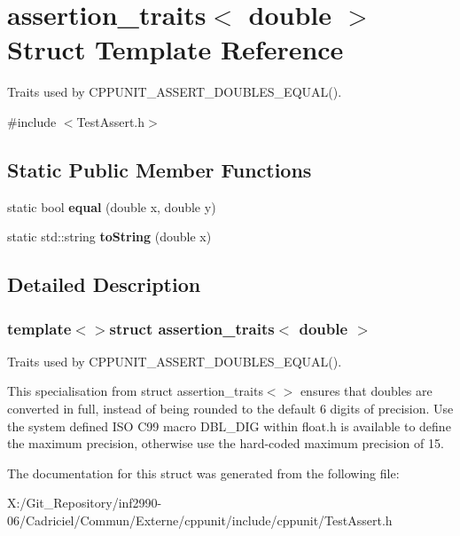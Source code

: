 \hypertarget{structassertion__traits_3_01double_01_4}{\section{assertion\-\_\-traits$<$ double $>$ Struct Template Reference}
\label{structassertion__traits_3_01double_01_4}
}


Traits used by C\-P\-P\-U\-N\-I\-T\-\_\-\-A\-S\-S\-E\-R\-T\-\_\-\-D\-O\-U\-B\-L\-E\-S\-\_\-\-E\-Q\-U\-A\-L().  




{\ttfamily \#include $<$Test\-Assert.\-h$>$}

\subsection*{Static Public Member Functions}
\begin{DoxyCompactItemize}
\item 
\hypertarget{structassertion__traits_3_01double_01_4_ac0d9d71ec0f239664b88188e481c0598}{static bool {\bfseries equal} (double x, double y)}\label{structassertion__traits_3_01double_01_4_ac0d9d71ec0f239664b88188e481c0598}

\item 
\hypertarget{structassertion__traits_3_01double_01_4_a6bc37874eb60d30e0b50d4c127ab34df}{static std\-::string {\bfseries to\-String} (double x)}\label{structassertion__traits_3_01double_01_4_a6bc37874eb60d30e0b50d4c127ab34df}

\end{DoxyCompactItemize}


\subsection{Detailed Description}
\subsubsection*{template$<$$>$struct assertion\-\_\-traits$<$ double $>$}

Traits used by C\-P\-P\-U\-N\-I\-T\-\_\-\-A\-S\-S\-E\-R\-T\-\_\-\-D\-O\-U\-B\-L\-E\-S\-\_\-\-E\-Q\-U\-A\-L(). 

This specialisation from {\ttfamily struct} {\ttfamily assertion\-\_\-traits$<$$>$} ensures that doubles are converted in full, instead of being rounded to the default 6 digits of precision. Use the system defined I\-S\-O C99 macro D\-B\-L\-\_\-\-D\-I\-G within float.\-h is available to define the maximum precision, otherwise use the hard-\/coded maximum precision of 15. 

The documentation for this struct was generated from the following file\-:\begin{DoxyCompactItemize}
\item 
X\-:/\-Git\-\_\-\-Repository/inf2990-\/06/\-Cadriciel/\-Commun/\-Externe/cppunit/include/cppunit/Test\-Assert.\-h\end{DoxyCompactItemize}
